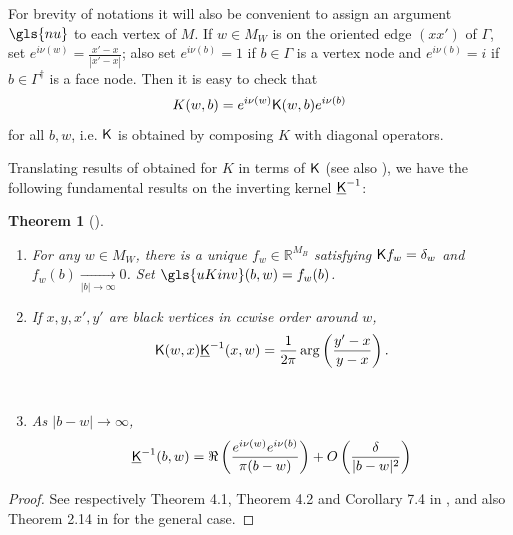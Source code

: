 \documentclass[10pt]{article}
\newcommand{\R}{\mathbb{R}}
\newcommand{\rK}{{\sf K}}
\newcommand{\uK}{{\underline {\sf K}}}
\newcommand{\dg}{\dagger}
\newtheorem{Thm}[thm]{Theorem}
\begin{document}
For brevity of notations it will also be convenient to assign an argument $\gls{nu}$ to each vertex of $M$. 
If $w\in M_W$ is on the oriented edge $(xx')$ of $\Gamma$, set $e^{i\nu(w)}=\frac{x'-x}{|x'-x|}$; also set $e^{i\nu(b)}=1$ if $b\in\Gamma$ is a vertex node and $e^{i\nu(b)}=i$ if $b\in\Gamma^\dg$ is a face node. Then it is easy to check that
\begin{equation}\label{eq:Kastgauge}
K(w,b)=e^{i\nu(w)}\rK(w,b)e^{i\nu(b)}
\end{equation}
for all $b,w$, i.e. $\rK$ is obtained by composing $K$ with diagonal operators.

Translating results of \cite{Ken_isoradial} obtained for $K$ in terms of $\rK$ (see also \cite{SmiChe_isoradial}), we have the following fundamental results on the inverting kernel $\uK^{-1}$:

\begin{Thm}[\cite{Ken_isoradial}]\label{Thm:Kencrit}
\begin{enumerate}
\item %
For any $w\in M_W$, there is a unique $f_w\in\R^{M_B}$ satisfying $\rK f_w=\delta_w$ and $f_w(b)\xrightarrow[|b|\rightarrow\infty]{} 0$. Set $\gls{uKinv}(b,w)=f_w(b)$.
\item If $x,y,x',y'$ are black vertices in ccwise order around $w$, 
%
$$\rK(w,x)\uK^{-1}(x,w)=\frac{1}{2\pi}\arg\left(\frac{y'-x}{y-x}\right).$$\\
\item As $|b-w|\rightarrow\infty$,
%
%
%
$$\uK^{-1}(b,w)=\Re\left(\frac{e^{i\nu(w)}e^{i\nu(b)}}{\pi(b-w)}\right)+O\left(\frac{\delta}{|b-w|^{2}}\right)$$
\end{enumerate}
\end{Thm}
\begin{proof}
See respectively Theorem 4.1, Theorem 4.2 and Corollary 7.4 in \cite{Ken_isoradial}, and also Theorem 2.14 in \cite{SmiChe_isoradial} for the general case.
\end{proof}
\end{document}
